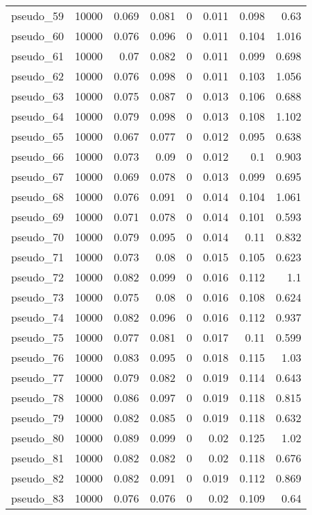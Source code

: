 \begin{table}[!htbp]
{\begin{tabular}{lrrrrrrr}
pseudo\_59 & 10000 & 0.069 & 0.081 & 0 & 0.011 & 0.098 & 0.63 \\ 
pseudo\_60 & 10000 & 0.076 & 0.096 & 0 & 0.011 & 0.104 & 1.016 \\ 
pseudo\_61 & 10000 & 0.07 & 0.082 & 0 & 0.011 & 0.099 & 0.698 \\ 
pseudo\_62 & 10000 & 0.076 & 0.098 & 0 & 0.011 & 0.103 & 1.056 \\ 
pseudo\_63 & 10000 & 0.075 & 0.087 & 0 & 0.013 & 0.106 & 0.688 \\ 
pseudo\_64 & 10000 & 0.079 & 0.098 & 0 & 0.013 & 0.108 & 1.102 \\ 
pseudo\_65 & 10000 & 0.067 & 0.077 & 0 & 0.012 & 0.095 & 0.638 \\ 
pseudo\_66 & 10000 & 0.073 & 0.09 & 0 & 0.012 & 0.1 & 0.903 \\ 
pseudo\_67 & 10000 & 0.069 & 0.078 & 0 & 0.013 & 0.099 & 0.695 \\ 
pseudo\_68 & 10000 & 0.076 & 0.091 & 0 & 0.014 & 0.104 & 1.061 \\ 
pseudo\_69 & 10000 & 0.071 & 0.078 & 0 & 0.014 & 0.101 & 0.593 \\ 
pseudo\_70 & 10000 & 0.079 & 0.095 & 0 & 0.014 & 0.11 & 0.832 \\ 
pseudo\_71 & 10000 & 0.073 & 0.08 & 0 & 0.015 & 0.105 & 0.623 \\ 
pseudo\_72 & 10000 & 0.082 & 0.099 & 0 & 0.016 & 0.112 & 1.1 \\ 
pseudo\_73 & 10000 & 0.075 & 0.08 & 0 & 0.016 & 0.108 & 0.624 \\ 
pseudo\_74 & 10000 & 0.082 & 0.096 & 0 & 0.016 & 0.112 & 0.937 \\ 
pseudo\_75 & 10000 & 0.077 & 0.081 & 0 & 0.017 & 0.11 & 0.599 \\ 
pseudo\_76 & 10000 & 0.083 & 0.095 & 0 & 0.018 & 0.115 & 1.03 \\ 
pseudo\_77 & 10000 & 0.079 & 0.082 & 0 & 0.019 & 0.114 & 0.643 \\ 
pseudo\_78 & 10000 & 0.086 & 0.097 & 0 & 0.019 & 0.118 & 0.815 \\ 
pseudo\_79 & 10000 & 0.082 & 0.085 & 0 & 0.019 & 0.118 & 0.632 \\ 
pseudo\_80 & 10000 & 0.089 & 0.099 & 0 & 0.02 & 0.125 & 1.02 \\ 
pseudo\_81 & 10000 & 0.082 & 0.082 & 0 & 0.02 & 0.118 & 0.676 \\ 
pseudo\_82 & 10000 & 0.082 & 0.091 & 0 & 0.019 & 0.112 & 0.869 \\ 
pseudo\_83 & 10000 & 0.076 & 0.076 & 0 & 0.02 & 0.109 & 0.64 \\ 

\end{tabular}}
\end{table}
